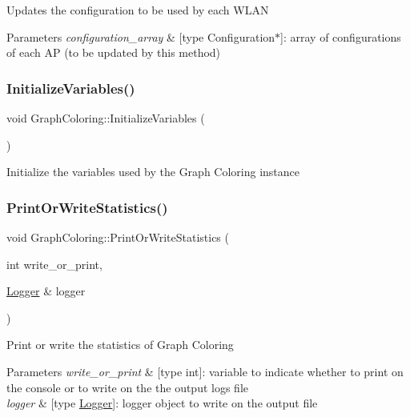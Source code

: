 Updates the configuration to be used by each W\+L\+AN 
\begin{DoxyParams}{Parameters}
{\em configuration\+\_\+array} & \mbox{[}type Configuration$\ast$\mbox{]}\+: array of configurations of each AP (to be updated by this method) \\
\hline
\end{DoxyParams}
\mbox{\label{classGraphColoring_ae67e3e5361b5d85a815bd4c4445392fb}} 
\subsubsection{\texorpdfstring{Initialize\+Variables()}{InitializeVariables()}}
{\footnotesize\ttfamily void Graph\+Coloring\+::\+Initialize\+Variables (\begin{DoxyParamCaption}{ }\end{DoxyParamCaption})\hspace{0.3cm}{\ttfamily [inline]}}

Initialize the variables used by the Graph Coloring instance \mbox{\label{classGraphColoring_a6c3b2f0e1cc3529604030302bbccd487}} 
\subsubsection{\texorpdfstring{Print\+Or\+Write\+Statistics()}{PrintOrWriteStatistics()}}
{\footnotesize\ttfamily void Graph\+Coloring\+::\+Print\+Or\+Write\+Statistics (\begin{DoxyParamCaption}\item[{int}]{write\+\_\+or\+\_\+print,  }\item[{\hyperlink{structLogger}{Logger} \&}]{logger }\end{DoxyParamCaption})\hspace{0.3cm}{\ttfamily [inline]}}

Print or write the statistics of Graph Coloring 
\begin{DoxyParams}{Parameters}
{\em write\+\_\+or\+\_\+print} & \mbox{[}type int\mbox{]}\+: variable to indicate whether to print on the console or to write on the the output logs file \\
\hline
{\em logger} & \mbox{[}type \hyperlink{structLogger}{Logger}\mbox{]}\+: logger object to write on the output file \\
\hline
\end{DoxyParams}
\mbox{\label{classGraphColoring_a8f0762e3222dac3389e315dbf6fac75e}} 
